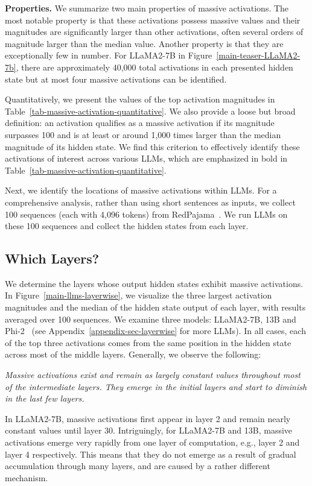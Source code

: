 \textbf{Properties.} We summarize two main properties of massive activations. The most notable property is that these activations possess massive values and their magnitudes are significantly larger than other activations, often several orders of magnitude larger than the median value. Another property is that they are exceptionally few in number. For LLaMA2-7B in Figure~\ref{main-teaser-LLaMA2-7b}, there are approximately 40,000 total activations in each presented hidden state but at most four massive activations can be identified. 

Quantitatively, we present the values of the top activation magnitudes in Table~\ref{tab-massive-activation-quantitative}. We also provide a loose but broad definition: an activation qualifies as a massive activation if its magnitude surpasses 100 and is at least or around 1,000 times larger than the median magnitude of its hidden state. We find this criterion to effectively identify these activations of interest across various LLMs, which are emphasized in bold in Table~\ref{tab-massive-activation-quantitative}.

Next, we identify the locations of massive activations within LLMs.  For a comprehensive analysis, rather than using short sentences as inputs, we collect 100 sequences (each with 4,096 tokens) from RedPajama~\citep{together2023redpajama}. We run LLMs on these 100 sequences and collect the hidden states from each layer.

\subsection{Which Layers?}\label{sec-layerwise}
We determine the layers whose output hidden states exhibit massive activations. In Figure~\ref{main-llms-layerwise}, we visualize the three largest activation magnitudes and the median of the hidden state output of each layer, with results averaged over 100 sequences. We examine three models: LLaMA2-7B, 13B and Phi-2~\citep{phi2} (see Appendix~\ref{appendix-sec-layerwise} for more LLMs). In all cases, each of the top three activations comes from the same position in the hidden state across most of the middle layers. Generally, we observe the following:

\textit{Massive activations exist and remain as largely constant values throughout most of the intermediate layers. They emerge in the initial layers and start to diminish in the last few layers.}

In LLaMA2-7B, massive activations first appear in layer 2 and remain nearly constant values until layer 30. Intriguingly, for LLaMA2-7B and 13B, massive activations emerge very rapidly from one layer of computation, e.g., layer 2 and layer 4 respectively. This means that they do not emerge as a result of gradual accumulation through many layers, and are caused by a rather different mechanism.

